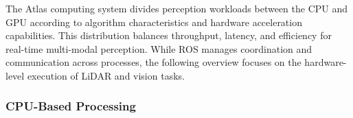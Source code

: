 The Atlas computing system divides perception workloads between the CPU and GPU according to algorithm characteristics and hardware acceleration capabilities.
This distribution balances throughput, latency, and efficiency for real-time multi-modal perception.
While \ac{ROS} manages coordination and communication across processes, the following overview focuses on the hardware-level execution of LiDAR and vision tasks.

\subsubsection{CPU-Based Processing}





